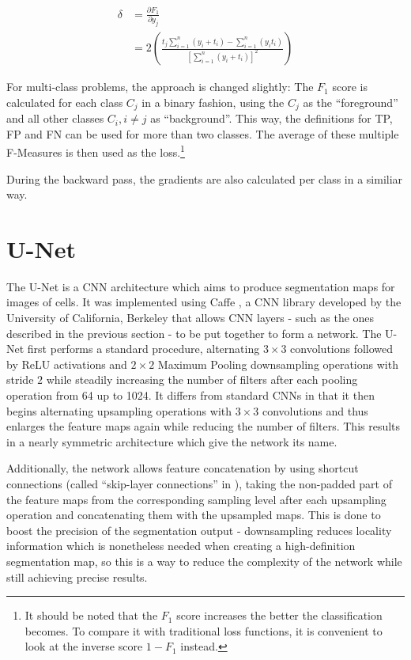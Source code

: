 \begin {align}
	\delta &= \frac{\partial F_1}{\partial y_j}\\
	&= 2 \left ( \frac{t_j \sum_{i=1}^{n} \left ( y_i + t_i \right ) - \sum_{i=1}^{n} \left ( y_i t_i \right )  }{\left [ \sum_{i=1}^{n} \left ( y_i + t_i \right ) \right ]^2 } \right )
\end {align}

\noindent For multi-class problems, the approach is changed slightly: The $F_1$ score is calculated for each class $C_j$ in a binary fashion, using the $C_j$ as the ``foreground'' and all other classes $C_i, i \neq j$ as ``background''. This way, the definitions for TP, FP and FN can be used for more than two classes. The average of these multiple F-Measures is then used as the loss.\footnote{It should be noted that the $F_1$ score increases the better the classification becomes. To compare it with traditional loss functions, it is convenient to look at the inverse score $1 - F_1$ instead.}

During the backward pass, the gradients are also calculated per class in a similiar way.


	\section {U-Net}
The U-Net \cite{unet} is a CNN architecture which aims to produce segmentation maps for images of cells. It was implemented using Caffe \cite{caffe}, a CNN library developed by the University of California, Berkeley that allows CNN layers - such as the ones described in the previous section - to be put together to form a network. The U-Net first performs a standard procedure, alternating $3 \times 3$ convolutions followed by ReLU activations and $2 \times 2$ Maximum Pooling downsampling operations with stride $2$ while steadily increasing the number of filters after each pooling operation from 64 up to 1024. It differs from standard CNNs in that it then begins alternating upsampling operations with $3 \times 3$ convolutions and thus enlarges the feature maps again while reducing the number of filters. This results in a nearly symmetric architecture which give the network its name.

Additionally, the network allows feature concatenation by using shortcut connections (called ``skip-layer connections'' in \cite{bishop_pattern}), taking the non-padded part of the feature maps from the corresponding sampling level after each upsampling operation and concatenating them with the upsampled maps. This is done to boost the precision of the segmentation output - downsampling reduces locality information which is nonetheless needed when creating a high-definition segmentation map, so this is a way to reduce the complexity of the network while still achieving precise results.

